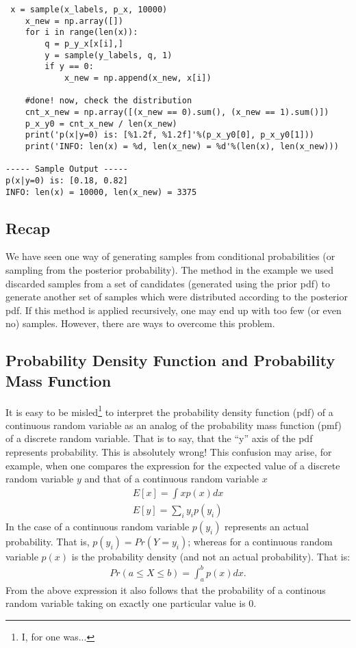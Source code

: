 \documentclass[11pt,onecolumn]{article}
\begin{document}
\begin{verbatim}
 x = sample(x_labels, p_x, 10000)
    x_new = np.array([])
    for i in range(len(x)):
        q = p_y_x[x[i],]
        y = sample(y_labels, q, 1)
        if y == 0:
            x_new = np.append(x_new, x[i])

    #done! now, check the distribution
    cnt_x_new = np.array([(x_new == 0).sum(), (x_new == 1).sum()])
    p_x_y0 = cnt_x_new / len(x_new)
    print('p(x|y=0) is: [%1.2f, %1.2f]'%(p_x_y0[0], p_x_y0[1]))
    print('INFO: len(x) = %d, len(x_new) = %d'%(len(x), len(x_new)))
    
----- Sample Output -----
p(x|y=0) is: [0.18, 0.82]
INFO: len(x) = 10000, len(x_new) = 3375

\end{verbatim}

\subsection{Recap}
We have seen one way of generating samples from conditional probabilities (or sampling from the posterior probability). The method in the example we used discarded samples from a set of candidates (generated using the prior pdf) to generate another set of samples which were distributed according to the posterior pdf. If this method is applied recursively, one may end up with too few (or even no) samples. However, there are ways to overcome this problem.


\begin{appendices}
\section{Probability Density Function and Probability Mass Function}
\label{app:a}
It is easy to be misled\footnote{I, for one was...} to interpret the probability density function (pdf) of a continuous random variable as an analog of the probability mass function (pmf) of a discrete random variable. That is to say, that the ``y'' axis of the pdf represents probability. This is absolutely wrong! This confusion may arise, for example, when one compares the expression for the expected value of a discrete random variable $y$ and that of a continuous random variable $x$
\begin{align}
E[x] = \int x p(x) dx \\
E[y] = \sum_i y_i p(y_i)
\end{align}
In the case of a continuous random variable $p(y_i)$ represents an actual probability. That is, $p(y_i) = Pr(Y = y_i)$; whereas for a continuous random variable $p(x)$ is the probability density (and not an actual probability). That is:
\begin{align}
Pr(a \le X \le b) = \int_{a}^b p(x) dx.
\end{align}
From the above expression it also follows that the probability of a continous random variable taking on exactly one particular value is  0. 
\end{appendices}
\end{document}
